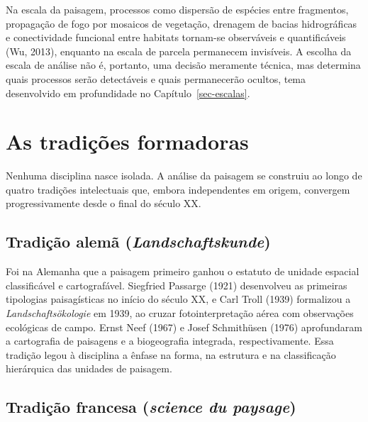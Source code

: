 \documentclass[
  portuguese,
  11pt,
  a4paper,
  open=any]{scrbook}
\begin{document}
Na escala da paisagem, processos como dispersão de espécies entre
fragmentos, propagação de fogo por mosaicos de vegetação, drenagem de
bacias hidrográficas e conectividade funcional entre habitats tornam-se
observáveis e quantificáveis (Wu, 2013), enquanto na escala de parcela
permanecem invisíveis. A escolha da escala de análise não é, portanto,
uma decisão meramente técnica, mas determina quais processos serão
detectáveis e quais permanecerão ocultos, tema desenvolvido em
profundidade no Capítulo~\ref{sec-escalas}.

\section{As tradições formadoras}\label{as-tradiuxe7uxf5es-formadoras}

Nenhuma disciplina nasce isolada. A análise da paisagem se construiu ao
longo de quatro tradições intelectuais que, embora independentes em
origem, convergem progressivamente desde o final do século XX.

\subsection{\texorpdfstring{Tradição alemã
(\emph{Landschaftskunde})}{Tradição alemã (Landschaftskunde)}}\label{tradiuxe7uxe3o-alemuxe3-landschaftskunde}

Foi na Alemanha que a paisagem primeiro ganhou o estatuto de unidade
espacial classificável e cartografável. Siegfried Passarge (1921)
desenvolveu as primeiras tipologias paisagísticas no início do século
XX, e Carl Troll (1939) formalizou a \emph{Landschaftsökologie} em 1939,
ao cruzar fotointerpretação aérea com observações ecológicas de campo.
Ernst Neef (1967) e Josef Schmithüsen (1976) aprofundaram a cartografia
de paisagens e a biogeografia integrada, respectivamente. Essa tradição
legou à disciplina a ênfase na forma, na estrutura e na classificação
hierárquica das unidades de paisagem.

\subsection{\texorpdfstring{Tradição francesa (\emph{science du
paysage})}{Tradição francesa (science du paysage)}}\label{tradiuxe7uxe3o-francesa-science-du-paysage}
\end{document}
